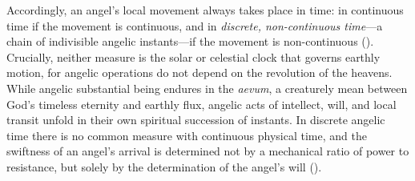 Accordingly, an angel's local movement always takes place in time: in continuous time if the movement is continuous, and in \emph{discrete, non-continuous time}---a chain of indivisible angelic instants---if the movement is non-continuous (). Crucially, neither measure is the solar or celestial clock that governs earthly motion, for angelic operations do not depend on the revolution of the heavens. While angelic substantial being endures in the \emph{aevum}, a creaturely mean between God's timeless eternity and earthly flux, angelic acts of intellect, will, and local transit unfold in their own spiritual succession of instants. In discrete angelic time there is no common measure with continuous physical time, and the swiftness of an angel's arrival is determined not by a mechanical ratio of power to resistance, but solely by the determination of the angel's will ().

